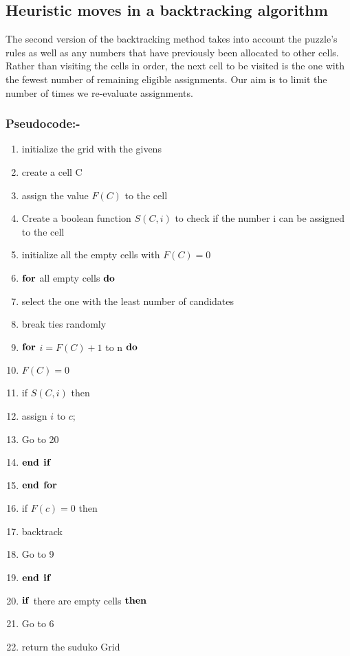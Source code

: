 \documentclass[12pt]{extarticle}
\theoremstyle{plain}
\begin{document}
\subsection*{Heuristic moves in a backtracking algorithm }
The second version of the backtracking method takes into account the puzzle's rules as well as any numbers that have previously been allocated to other cells. Rather than visiting the cells in order, the next cell to be visited is the one with the fewest number of remaining eligible assignments. Our aim is to limit the number of times we re-evaluate assignments.
\subsubsection*{Pseudocode:-}
\begin{enumerate}
    \item initialize the grid with the givens
    \item create a cell C
    \item assign the value $F(C)$ to the cell
    \item Create a boolean function $S(C,i)$ to check if the number i can be assigned to the cell
    \item initialize all the empty cells with $F(C)=0$
    \item $\bold{for}$ all empty cells $\bold{do}$
    \item select the one with the least number of candidates
    \item break ties randomly
    \item $\bold{for}$ $i=F(C)+1$ to n $\bold{do}$
    \item $F(C)=0$
    \item if $S(C,i)$ then
    \item assign $i$ to $c$;
    \item Go to 20
    \item $\bold{end}$ $\bold{if}$
    \item $\bold{end}$ $\bold{for}$
    \item if $F(c)=0$ then
    \item backtrack
    \item Go to 9
    \item $\bold{end}$ $\bold{if}$
    \item $\bold{if}$ there are empty cells $\bold{then}$
    \item Go to 6
    \item return the suduko Grid
\end{enumerate}
\end{document}
